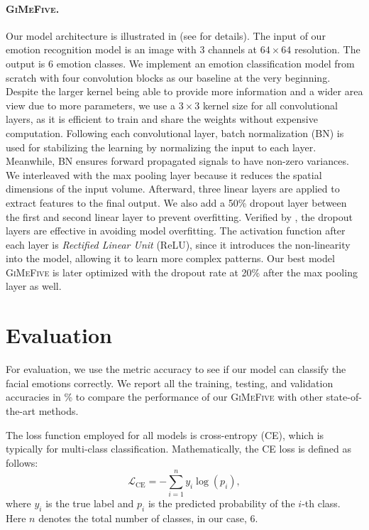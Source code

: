 \paragraph{\textsc{GiMeFive}.}
Our model architecture is illustrated in  (see  for details). 
The input of our emotion recognition model is an image with 3 channels at $64 \times 64 $ resolution. 
The output is 6 emotion classes. %
We implement an emotion classification model from scratch with four convolution blocks as our baseline at the very beginning. 
Despite the larger kernel being able to provide more information and a wider area view due to more parameters, 
we use a $3 \times 3$ kernel size for all convolutional layers, 
as it is efficient to train and share the weights without expensive computation. 
Following each convolutional layer, 
batch normalization (BN) is used for stabilizing the learning by normalizing the input to each layer. 
Meanwhile, 
BN ensures forward propagated signals to have non-zero variances. 
We interleaved with the max pooling layer because it reduces the spatial dimensions of the input volume. 
Afterward, three linear layers are applied to extract features to the final output. 
We also add a 50\% dropout layer between the first and second linear layer to prevent overfitting. 
Verified by \citet{BarsoumZCZ16}, 
the dropout layers are effective in avoiding model overfitting. 
The activation function after each layer is \textit{Rectified Linear Unit} (ReLU), 
since it introduces the non-linearity into the model, 
allowing it to learn more complex patterns. 
Our best model \textsc{GiMeFive} is later optimized with the dropout rate at 20\% after the max pooling layer as well.

\section{Evaluation}
\label{sec:evaluation}

For evaluation, we use the metric accuracy to see if our model can classify the facial emotions correctly. 
We report all the training, testing, and validation accuracies in 
\% to compare the performance of our \textsc{GiMeFive} with other state-of-the-art methods. 

The loss function employed for all models is cross-entropy (CE), 
which is typically for multi-class classification. 
Mathematically, the CE loss is defined as follows: 
\begin{equation}
  \mathcal{L}_{\text{CE}} = -\sum_{i=1}^{n} y_i \log(p_i),
\end{equation}
where $y_i$ is the true label and $p_i$ is the predicted probability of the $i$-th class. 
Here $n$ denotes the total number of classes, in our case, 6.

